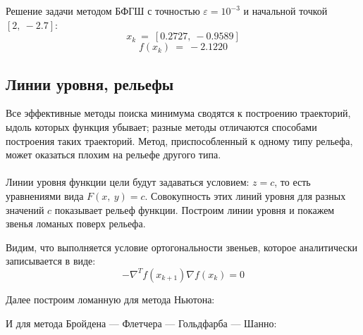 \documentclass{article}
\begin{document}
\noindent Решение задачи методом БФГШ с точностью $\varepsilon = 10^{-3}$ и начальной точкой $[2,~-2.7]$:
$$x_k~=~[0.2727,~-0.9589]$$
$$f(x_k)~=~-2.1220$$

\subsection{Линии уровня, рельефы}
\noindent Все эффективные методы поиска минимума сводятся к построению траекторий, ыдоль которых функция убывает; разные методы отличаются способами построения таких траекторий. Метод, приспособленный к одному типу рельефа, может оказаться плохим на рельефе другого типа.\\\\
\noindent Линии уровня функции цели будут задаваться условием: $z=c$, то есть уравнениями вида $F(x,~y)=c$. Совокупность этих линий уровня для разных значений $c$ показывает рельеф функции. Построим линии уровня и покажем звенья ломаных поверх рельефа.

\begin{figure}[H]
\label{fig:image}
\end{figure}
\noindent Видим, что выполняется условие ортогональности звеньев, которое аналитически записывается в виде:
$$-\nabla^{T} f(x_{k+1})\nabla f(x_k)=0$$

\noindent Далее построим ломанную для метода Ньютона:
\begin{figure}[H]
\label{fig:image}
\end{figure}
\noindent И для метода Бройдена — Флетчера — Гольдфарба — Шанно:
\begin{figure}[H]
\label{fig:image}
\end{figure}
\end{document}
